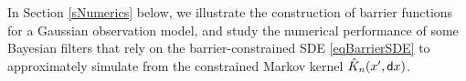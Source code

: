 \documentclass[onefignum,onetabnum]{siamonline250211}%
\begin{document}
In Section \ref{sNumerics} below, we illustrate the construction of barrier functions for a Gaussian observation model, and study the numerical performance of some Bayesian filters that rely on the barrier-constrained SDE \eqref{eqBarrierSDE} to approximately simulate from the constrained Markov kernel $\hat K_n(x',{\sf d} x)$.

\end{document}
